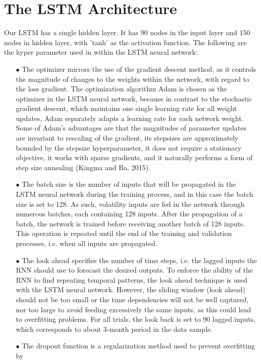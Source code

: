 \documentclass[a4paper,11pt,oneside]{book}
\begin{document}
\section{The LSTM Architecture}
Our LSTM has a single hidden layer. It has 90 nodes in the input layer and 150 nodes in hidden layer, with 'tanh' as the activation function. The following are the hyper parameter used in within the LSTM neural network:
\begin{itemize}

\item[$\bullet$]   The optimizer mirrors the use of the gradient descent method, as it controls the
magnitude of changes to the weights within the network, with regard to the
loss gradient. The optimization algorithm Adam is chosen as the optimizer in
the LSTM neural network, because in contrast to the stochastic gradient
descent, which maintains one single learning rate for all weight updates, Adam
separately adapts a learning rate for each network weight. Some of Adam’s advantages are that the magnitudes of parameter updates are invariant to
rescaling of the gradient, its stepsizes are approximately bounded by the stepsize hyperparameter,
it does not require a stationary objective, it works with sparse gradients, and it naturally performs a
form of step size annealing (Kingma and Ba, 2015).
\item[$\bullet$] The batch size is the number of inputs that will be propagated in the
LSTM neural network during the training process, and in this case the batch
size is set to 128. As such, volatility inputs are
fed in the network through numerous batches, each containing 128 inputs. After
the propagation of a batch, the network is trained before receiving another
batch of 128 inputs. This operation is repeated until the end of the training and
validation processes, i.e. when all inputs are propagated.
\item[$\bullet$] The look ahead specifies the number of time steps, i.e. the lagged
inputs the RNN should use to forecast the desired outputs. To enforce the ability of the RNN to find
repeating temporal patterns, the look ahead
technique is used with the LSTM neural
network. However, the sliding window (look ahead) should not be too small or the time
dependencies will not be well captured, nor too large to avoid feeding
excessively the same inputs, as this could lead to overfitting problems. For all trials, the look back is set to 90 lagged inputs, which
corresponds to about 3-month period in the data sample.
\item[$\bullet$] The dropout function is a regularization method used to prevent overfitting by

\end{itemize}
\end{document}
